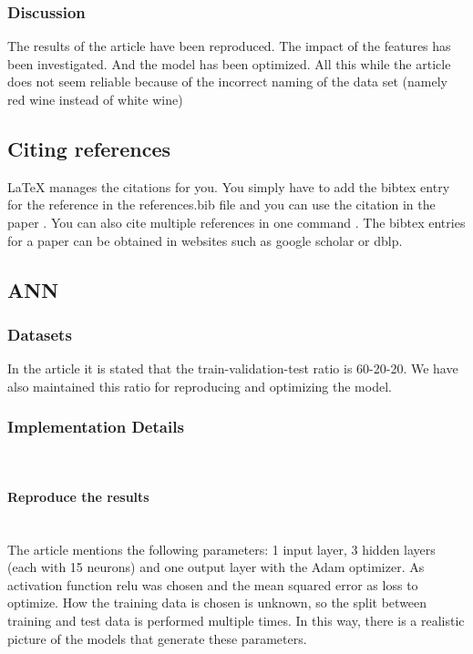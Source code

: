 \documentclass{article}
\newcommand{\subsubsubsection}[1]{%
  \paragraph{#1}\mbox{}\\}
\begin{document}
\subsubsection{Discussion}


The results of the article have been reproduced. The impact of the features has been investigated. And the model has been optimized. All this while the article does not seem reliable because of the incorrect naming of the data set (namely red wine instead of white wine)


\subsection{Citing references}
LaTeX manages the citations for you. You simply have to add the bibtex entry for the reference in the references.bib file and you can use the citation in the paper \cite{langley00}. You can also cite multiple references in one command \cite{DudaHart2nd,Newell81,kearns89}. The bibtex entries for a paper can be obtained in websites such as google scholar or dblp.

\subsection{ANN}

\subsubsection{Datasets}
In the article it is stated that the train-validation-test ratio is 60-20-20. We have also maintained this ratio for reproducing and optimizing the model.

\subsubsection{Implementation Details}

\subsubsubsection{Reproduce the results}
The article mentions the following parameters: 1 input layer, 3 hidden layers (each with 15 neurons) and one output layer with the Adam optimizer.
As activation function relu was chosen and the mean squared error as loss to optimize.
How the training data is chosen is unknown, so the split between training and test data is performed multiple times. In this way, there is a realistic picture of the models that generate these parameters.
\end{document}
